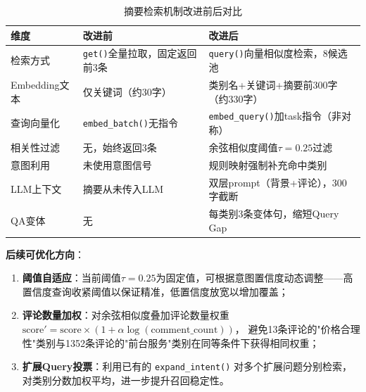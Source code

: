 \documentclass[11pt, a4paper]{article}
\begin{document}
\begin{table}[H]
\centering
\caption{摘要检索机制改进前后对比}
\label{tab:summary-compare}
\setlength{\tabcolsep}{5pt}
\begin{tabular}{p{3.5cm}p{5.0cm}p{5.5cm}}
\toprule
\textbf{维度} & \textbf{改进前} & \textbf{改进后} \\
\midrule
检索方式 & \texttt{get()}全量拉取，固定返回前3条 & \texttt{query()}向量相似度检索，8候选池 \\
Embedding文本 & 仅关键词（约30字） & 类别名+关键词+摘要前300字（约330字） \\
查询向量化 & \texttt{embed\_batch()}无指令 & \texttt{embed\_query()}加task指令（非对称） \\
相关性过滤 & 无，始终返回3条 & 余弦相似度阈值$\tau=0.25$过滤 \\
意图利用 & 未使用意图信号 & 规则映射强制补充命中类别 \\
LLM上下文 & 摘要从未传入LLM & 双层prompt（背景+评论），300字截断 \\
QA变体 & 无 & 每类别3条变体句，缩短Query Gap \\
\bottomrule
\end{tabular}
\end{table}

\textbf{后续可优化方向}：

\begin{enumerate}[leftmargin=2em]
  \item \textbf{阈值自适应}：当前阈值$\tau=0.25$为固定值，可根据意图置信度动态调整——高置信度查询收紧阈值以保证精准，低置信度放宽以增加覆盖；
  \item \textbf{评论数量加权}：对余弦相似度叠加评论数量权重
    $\text{score}' = \text{score} \times (1 + \alpha \log(\text{comment\_count}))$，
    避免13条评论的"价格合理性"类别与1352条评论的"前台服务"类别在同等条件下获得相同权重；
  \item \textbf{扩展Query投票}：利用已有的 \texttt{expand\_intent()} 对多个扩展问题分别检索，对类别分数加权平均，进一步提升召回稳定性。
\end{enumerate}
\end{document}
